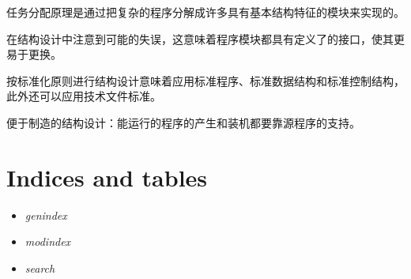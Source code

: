 \documentclass[letterpaper,10pt,english]{sphinxmanual}
\begin{document}
任务分配原理是通过把复杂的程序分解成许多具有基本结构特征的模块来实现的。

在结构设计中注意到可能的失误，这意味着程序模块都具有定义了的接口，使其更易于更换。

按标准化原则进行结构设计意味着应用标准程序、标准数据结构和标准控制结构，此外还可以应用技术文件标准。

便于制造的结构设计：能运行的程序的产生和装机都要靠源程序的支持。


\chapter{Indices and tables}
\label{index:indices-and-tables}\begin{itemize}
\item {} 
\emph{genindex}

\item {} 
\emph{modindex}

\item {} 
\emph{search}

\end{itemize}



\renewcommand{\indexname}{Index}
\printindex
\end{document}
